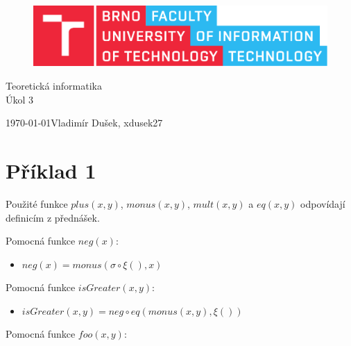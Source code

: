 \documentclass[11pt, a4paper, titlepage]{article}
\begin{document}
\begin{titlepage}
    \begin{center}
        \begin{figure}[htb]
            \centering
            \includegraphics[width=0.85\hsize]{images/fitlogo.pdf}
        \end{figure}
        {\Huge Teoretická informatika} \\
        \bigskip
        {\LARGE Úkol 3} \\
    \end{center}
    {\Large \today \hfill Vladimír Dušek, xdusek27}
\end{titlepage}





\section*{Příklad 1}


Použité funkce $plus(x, y)$, $monus(x, y)$, $mult(x, y)$ a $eq(x, y)$ odpovídají definicím z přednášek.
\bigskip

Pomocná funkce $neg(x)$:

\begin{itemize}
	\item $neg(x) = monus (\sigma \circ \xi(), x)$
\end{itemize}

Pomocná funkce $isGreater(x, y)$:

\begin{itemize}
	\item $isGreater(x, y) = neg \circ eq(monus(x, y), \xi())$
\end{itemize}

Pomocná funkce $foo(x, y)$:
\end{document}
